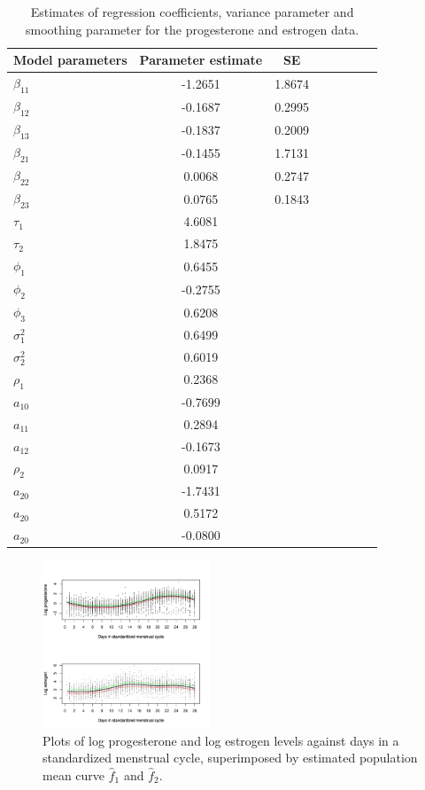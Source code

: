 \documentclass[12pt, notitlepage]{article}
\begin{document}
\begin{table}
\centering
\caption{Estimates of regression coefficients, variance parameter and smoothing parameter for the progesterone and estrogen data.} 
\label{tableLiu}
\begin{tabular}{l*{6}{c}r}
\hline
\hline
Model parameters              & Parameter estimate   & SE  
\\
\hline
$\beta_{11}$       & -1.2651         & 1.8674          \\
$\beta_{12}$       & -0.1687         & 0.2995          \\
$\beta_{13}$       & -0.1837         & 0.2009          \\
$\beta_{21}$        & -0.1455         & 1.7131          \\
$\beta_{22}$        &  0.0068         & 0.2747          \\
$\beta_{23}$        &  0.0765         & 0.1843          \\
$\tau_1$   &   4.6081      \\
$\tau_2$   &   1.8475      \\
$\phi_1$   &   0.6455      \\
$\phi_2$   &  -0.2755      \\
$\phi_3$   &   0.6208      \\
$\sigma_1^2$   &   0.6499      \\
$\sigma_2^2$   &   0.6019      \\
$\rho_1$   &   0.2368      \\
$a_{10}$   &  -0.7699      \\
$a_{11}$   &   0.2894      \\
$a_{12}$   &  -0.1673      \\
$\rho_2$   &   0.0917      \\
$a_{20}$   &  -1.7431      \\
$a_{20}$   &   0.5172      \\
$a_{20}$   &  -0.0800      \\
\hline
\end{tabular}
\end{table}

\begin{figure} 
\centering
\includegraphics[width=50mm]{bivLiuFig1.pdf}
\caption{Plots of log progesterone  and log estrogen levels against days in a standardized menstrual cycle, superimposed by estimated population mean curve $\hat f_1$ and $\hat f_2$.}
\label{Liu1}
\end{figure}
\end{document}
